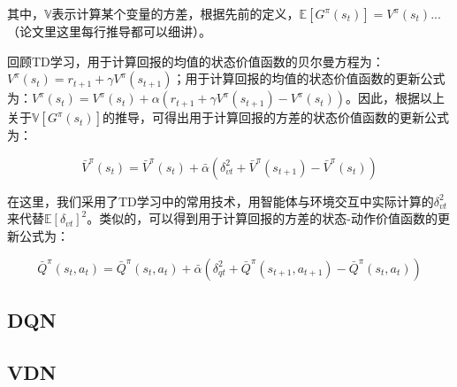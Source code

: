 \documentclass[UTF8]{ctexart}
\begin{document}
其中，$\mathbb{V}$表示计算某个变量的方差，根据先前的定义，$\mathbb{E}[G^{\pi}(s_t)] = V^{\pi}(s_t)$...（论文里这里每行推导都可以细讲）。

回顾TD学习，用于计算回报的均值的状态价值函数的贝尔曼方程为：$V^{\pi}(s_t) = r_{t+1} + \gamma V^{\pi}(s_{t+1})$；用于计算回报的均值的状态价值函数的更新公式为：$V^{\pi}(s_t) = V^{\pi}(s_t) + \alpha (r_{t+1} + \gamma V^{\pi}(s_{t+1}) - V^{\pi}(s_t))$。因此，根据以上关于$\mathbb{V}[G^{\pi}(s_t)]$的推导，可得出用于计算回报的方差的状态价值函数的更新公式为：

$$
\bar{V}^{\pi}(s_t) = \bar{V}^{\pi}(s_t) + \bar{\alpha}(\delta_{vt}^2 + \bar{V}^{\pi}(s_{t+1}) - \bar{V}^{\pi}(s_t))
$$

在这里，我们采用了TD学习中的常用技术，用智能体与环境交互中实际计算的$\delta_{vt}^2$来代替$\mathbb{E}[\delta_{vt}]^2$。类似的，可以得到用于计算回报的方差的状态-动作价值函数的更新公式为：

$$
\bar{Q}^{\pi}(s_t, a_t) = \bar{Q}^{\pi}(s_t, a_t) + \bar{\alpha}(\delta_{qt}^2 + \bar{Q}^{\pi}(s_{t+1}, a_{t+1}) - \bar{Q}^{\pi}(s_t, a_t))
$$


\subsection{DQN}




\subsection{VDN}

	
	
\end{document}

